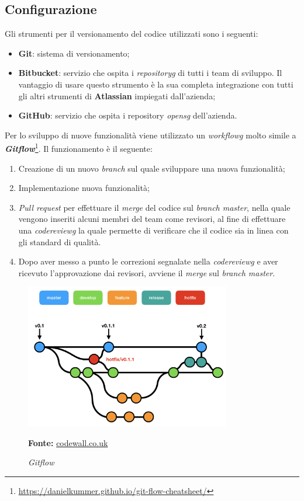 \subsection{Configurazione}\label{sec:configurazione}
Gli strumenti per il versionamento del codice utilizzati sono i seguenti:
\begin{itemize}
    \item \textbf{Git}: sistema di versionamento;
    \item \textbf{Bitbucket}: servizio che ospita i \textit{\gls{repositoryg}} di tutti i team di sviluppo. Il vantaggio di usare questo strumento è la sua completa integrazione con tutti gli altri strumenti di \textbf{Atlassian} impiegati dall'azienda;
    \item \textbf{GitHub}: servizio che ospita i repository \textit{\gls{opensg}} dell'azienda.
\end{itemize}
Per lo sviluppo di nuove funzionalità viene utilizzato un \textit{\gls{workflowg}} molto simile a \textbf{\textit{Gitflow}}\footnote{\url{https://danielkummer.github.io/git-flow-cheatsheet/}}. Il funzionamento è il seguente:
\begin{enumerate}
    \item Creazione di un nuovo \textit{branch} sul quale sviluppare una nuova funzionalità;
    \item Implementazione nuova funzionalità;
    \item \textit{Pull request} per effettuare il \textit{merge} del codice sul \textit{branch master}, nella quale vengono inseriti alcuni membri del team come revisori, al fine di effettuare una \textit{\gls{codereviewg}} la quale permette di verificare che il codice sia in linea con gli standard di qualità.
    \item Dopo aver messo a punto le correzioni segnalate nella \textit{\gls{codereviewg}} e aver ricevuto l'approvazione dai revisori, avviene il \textit{merge} sul \textit{branch master}.
\end{enumerate}
    \begin{figure}[h]
        \centering
        \includegraphics[width=0.8\textwidth]{immagini/git_flow.png}
        \caption{\textit{Gitflow}}
        \textbf{Fonte:} \href{https://www.codewall.co.uk/a-git-flow-explainer-how-to-tutorial/}{codewall.co.uk}
        \label{fig: Gitflow}
    \end{figure}

